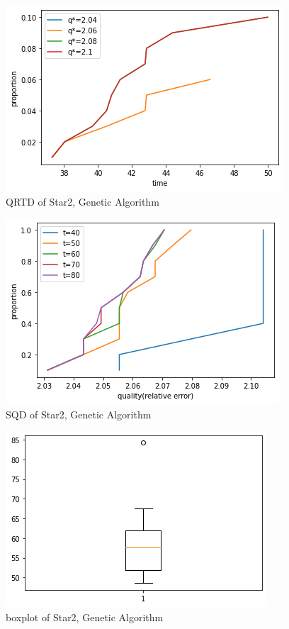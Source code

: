 \documentclass[acmlarge]{acmart}
\begin{document}
\begin{figure}[h]
	\includegraphics[width=\linewidth]{star2_LS2_QRTD.png}
	\caption{QRTD of Star2, Genetic Algorithm}
\end{figure}


\begin{figure}[h]
	\includegraphics[width=\linewidth]{star2_LS2_SQD.png}
	\caption{SQD of Star2, Genetic Algorithm}
\end{figure}

\begin{figure}[h]
	\includegraphics[width=\linewidth]{star2_LS2_box.png}
	\caption{boxplot of Star2, Genetic Algorithm}
\end{figure}
\end{document}
